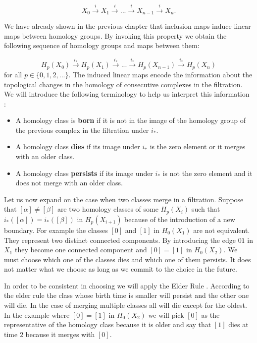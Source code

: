 $$ X_0 \overset{i}{\longrightarrow} X_1 \overset{i}{\longrightarrow} ... \overset{i}{\longrightarrow} X_{n-1} \overset{i}{\longrightarrow} X_n .$$

We have already shown in the previous chapter that inclusion maps induce linear maps between homology groups. By invoking this property we obtain the following sequence of homology groups and maps between them:

$$ H_p(X_0) \overset{i_*}{\longrightarrow} H_p(X_1) \overset{i_*}{\longrightarrow} ... \overset{i_*}{\longrightarrow} H_p(X_{n-1}) \overset{i_*}{\longrightarrow} H_p(X_n) $$
for all $p \in \{0, 1, 2, ...\}$. The induced linear maps encode the information about the topological changes in the homology of consecutive complexes in the filtration. We will introduce the following terminology to help us interpret this information \cite[p. 104]{elementary-applied-topology}:

\begin{itemize}
    \item A homology class is \textbf{born} if it is not in the image of the homology group of the previous complex in the filtration under $i_*$.
    \item A homology class \textbf{dies} if its image under $i_*$ is the zero element or it merges with an older class.
    \item A homology class \textbf{persists} if its image under $i_*$ is not the zero element and it does not merge with an older class.
\end{itemize}

Let us now expand on the case when two classes merge in a filtration. Suppose that $[\alpha] \ne [\beta]$ are two homology classes of some $H_p(X_i)$ such that $i_*([\alpha]) = i_*([\beta])$ in $H_p(X_{i+1})$ because of the introduction of a new boundary. For example the classes $[0]$ and $[1]$ in $H_0(X_1)$ are not equivalent. They represent two distinct connected components. By introducing the edge $01$ in $X_1$ they become one connected component and $[0] = [1]$ in $H_0(X_2)$. We must choose which one of the classes dies and which one of them persists. It does not matter what we choose as long as we commit to the choice in the future.

In order to be consistent in choosing we will apply the Elder Rule \cite[p.~150]{comp-topo}. According to the elder rule the class whose birth time is smaller will persist and the other one will die. In the case of merging multiple classes all will die except for the oldest. In the example where $[0] = [1]$ in $H_0(X_2)$ we will pick $[0]$ as the representative of the homology class because it is older and say that $[1]$ dies at time $2$ because it merges with $[0]$.

